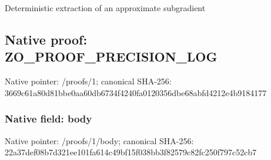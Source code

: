 \documentclass[10pt,a4paper]{article}
\begin{document}
\begingroup\raggedright\sloppy Deterministic extraction of an approximate subgradient\par\endgroup

\subsection{Native proof: ZO\_\allowbreak{}PROOF\_\allowbreak{}PRECISION\_\allowbreak{}LOG}
Native pointer: /proofs/1; canonical SHA-256: 3669c61a80d81bbe0aa60db6734f4240fa0120356dbe68abfd4212e4b9184177

\subsubsection{Native field: body}
Native pointer: /proofs/1/body; canonical SHA-256: 22a37def08b7d321ee101fa614c49bf15f038bb3f82579c82fc250f797c52cb7
\end{document}
